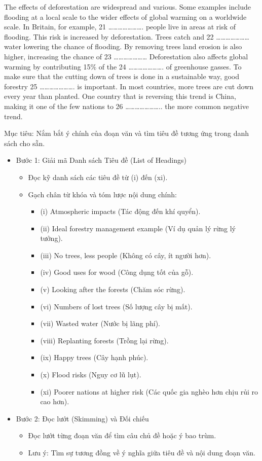 \documentclass{../templateReading/cdreading}
\begin{document}
The effects of deforestation are widespread and various. Some examples include flooding at a local scale to the wider effects of global warming on a worldwide scale. In Britain, for example, 21 …………………. people live in areas at risk of flooding. This risk is increased by deforestation. Trees catch and 22 ………………… water lowering the chance of flooding. By removing trees land erosion is also higher, increasing the chance of 23 ………………… Deforestation also affects global warming by contributing 15\% of the 24 …………………. of greenhouse gasses. To make sure that the cutting down of trees is done in a sustainable way, good forestry 25 …………………. is important. In most countries, more trees are cut down every year than planted. One country that is reversing this trend is China, making it one of the few nations to 26 ………………….. the more common negative trend.



Mục tiêu: Nắm bắt ý chính của đoạn văn và tìm tiêu đề tương ứng trong danh sách cho sẵn.

\begin{itemize}
\item Bước 1: Giải mã Danh sách Tiêu đề (List of Headings)
\begin{itemize}
\item Đọc kỹ danh sách các tiêu đề từ (i) đến (xi).
\item Gạch chân từ khóa và tóm lược nội dung chính:
\begin{itemize}
\item (i) Atmospheric impacts (Tác động đến khí quyển).
\item (ii) Ideal forestry management example (Ví dụ quản lý rừng lý tưởng).
\item (iii) No trees, less people (Không có cây, ít người hơn).
\item (iv) Good uses for wood (Công dụng tốt của gỗ).
\item (v) Looking after the forests (Chăm sóc rừng).
\item (vi) Numbers of lost trees (Số lượng cây bị mất).
\item (vii) Wasted water (Nước bị lãng phí).
\item (viii) Replanting forests (Trồng lại rừng).
\item (ix) Happy trees (Cây hạnh phúc).
\item (x) Flood risks (Nguy cơ lũ lụt).
\item (xi) Poorer nations at higher risk (Các quốc gia nghèo hơn chịu rủi ro cao hơn).
\end{itemize}
\end{itemize}
\item Bước 2: Đọc lướt (Skimming) và Đối chiếu
\begin{itemize}
\item Đọc lướt từng đoạn văn để tìm câu chủ đề hoặc ý bao trùm.
\item Lưu ý: Tìm sự tương đồng về ý nghĩa giữa tiêu đề và nội dung đoạn văn.
\end{itemize}
\end{itemize}
\end{document}

